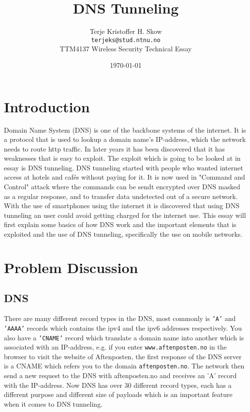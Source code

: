 \documentclass[a4paper,11pt]{article}
\title{DNS Tunneling}
\author{Terje Kristoffer H. Skow \\
	\texttt{terjeks@stud.ntnu.no}\\
	TTM4137 Wireless Security Technical Essay}
\date{\today}
\begin{document}
\maketitle

\section{Introduction}


Domain Name System (DNS) is one of the backbone systems of the internet. It is a protocol that is used to lookup a domain name's IP-address, which the network needs to route http traffic. In later years it has been discovered that it has weaknesses that is easy to exploit. The exploit which is going to be looked at in essay is DNS tunneling. DNS tunneling started with people who wanted internet access at hotels and cafés without paying for it. It is now used in "Command and Control" attack where the commands can be sendt encrypted over DNS masked as a regular response, and to transfer data undetected out of a secure network. With the use of smartphones using the internet it is discovered that using DNS tunneling an user could avoid getting charged for the internet use. This essay will first explain some basics of how DNS work and the important elements that is exploited and the use of DNS tunneling, specifically the use on mobile networks.





\section{Problem Discussion}
\subsection{DNS}
There are many different record types in the DNS, most commonly is \texttt{'A'} and \texttt{'AAAA'} records which contains the ipv4 and the ipv6 addresses respectively. You also have a \texttt{'CNAME'} record which translate a domain name into another which is associated with an IP-address, e.g. if you enter \texttt{www.aftenposten.no} in the browser to visit the website of Aftenposten, the first response of the DNS server is a CNAME which refers you to the domain \texttt{aftenposten.no}. The network then send a new request to the DNS with aftenposten.no and receives an 'A' record with the IP-address. Now DNS has over 30 different record types, each has a different purpose and different size of payloads which is an important feature when it comes to DNS tunneling.
\end{document}
